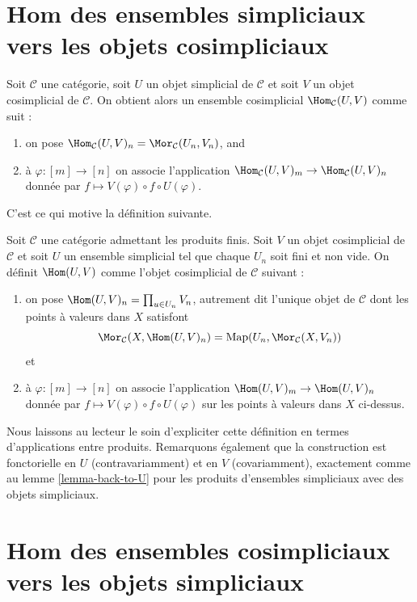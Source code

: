 \section{Hom des ensembles simpliciaux vers les objets cosimpliciaux}
\label{section-hom-from-simplicial-sets-into-cosimplicial}

\noindent
Soit $\mathcal{C}$ une catégorie, soit $U$ un objet simplicial de
$\mathcal{C}$ et soit $V$ un objet cosimplicial de $\mathcal{C}$.
On obtient alors un ensemble cosimplicial $\Hom_\mathcal{C}(U, V)$
comme suit :
\begin{enumerate}
\item on pose
$\Hom_\mathcal{C}(U, V)_n = \Mor_\mathcal{C}(U_n, V_n)$, and
\item à $\varphi : [m] \to [n]$ on associe l'application
$\Hom_\mathcal{C}(U, V)_m \to \Hom_\mathcal{C}(U, V)_n$
donnée par $f \mapsto V(\varphi) \circ f \circ U(\varphi)$.
\end{enumerate}
C'est ce qui motive la définition suivante.

\begin{definition}
\label{definition-hom-deltak-cosimplicial}
Soit $\mathcal{C}$ une catégorie admettant les produits finis. Soit $V$
un objet cosimplicial de $\mathcal{C}$ et soit $U$ un ensemble simplicial
tel que chaque $U_n$ soit fini et non vide. On définit
{\it $\Hom(U, V)$} comme l'objet cosimplicial de $\mathcal{C}$ suivant :
\begin{enumerate}
\item on pose $\Hom(U, V)_n = \prod_{u \in U_n} V_n$, autrement dit
l'unique objet de $\mathcal{C}$ dont les points à valeurs dans $X$
satisfont
$$
\Mor_\mathcal{C}(X, \Hom(U, V)_n)
=
\text{Map}(U_n, \Mor_\mathcal{C}(X, V_n))
$$
et
\item à $\varphi : [m] \to [n]$ on associe l'application
$\Hom(U, V)_m \to \Hom(U, V)_n$
donnée par $f \mapsto V(\varphi) \circ f \circ U(\varphi)$ sur les
points à valeurs dans $X$ ci-dessus.
\end{enumerate}
\end{definition}

\noindent
Nous laissons au lecteur le soin d'expliciter cette définition en termes
d'applications entre produits. Remarquons également que la construction est
fonctorielle en $U$ (contravariamment) et en $V$ (covariamment), exactement
comme au lemme \ref{lemma-back-to-U} pour les produits d'ensembles
simpliciaux avec des objets simpliciaux.




\section{Hom des ensembles cosimpliciaux vers les objets simpliciaux}
\label{section-hom-from-cosimplicial-sets-into-simplicial}

